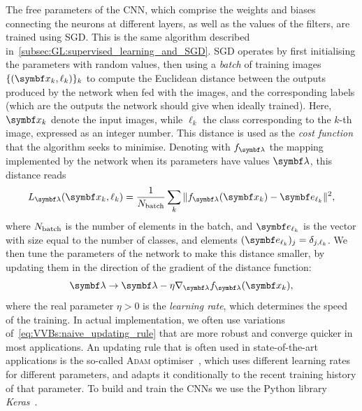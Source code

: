 The free parameters of the CNN, which comprise the weights and biases connecting the neurons at different layers, as well as the values of the filters, are trained using \ac{SGD}. This is the same algorithm described in~\cref{subsec:GL:supervised_learning_and_SGD}.
\ac{SGD} operates by first initialising the parameters with random values, then using a \emph{batch} of training images $\{(\bs x_k,\ell_k)\}_k$ to compute the Euclidean distance between the outputs produced by the network when fed with the images, and the corresponding labels (which are the outputs the network should give when ideally trained).
Here, $\bs x_k$ denote the input images, while $\ell_k$ the class corresponding to the $k$-th image, expressed as an integer number.
This distance is used as the \emph{cost function} that the algorithm seeks to minimise.
Denoting with $f_\bslambda$ the mapping implemented by the network when its parameters have values $\bslambda$, this distance reads
\begin{equation}
	L_\bslambda(\bs x_k,\ell_k) = \frac{1}{N_{\on{batch}}}
	\sum_k \|f_\bslambda(\bs x_k)-\bs e_{\ell_k}\|^2,
\end{equation}
where $N_{\operatorname{batch}}$ is the number of elements in the batch, and $\bs e_{\ell_k}$ is the vector with size equal to the number of classes, and elements $(\bs e_{\ell_k})_j=\delta_{j,\ell_k}$.
We then tune the parameters of the network to make this distance smaller, by updating them in the direction of the gradient of the distance function:
\begin{equation}
	\bslambda \to
	\bslambda - \eta \nabla_\bslambda f_\bslambda(\bs x_k),
	\label{eq:VVBs:naive_updating_rule}
\end{equation}
where the real parameter $\eta>0$ is the \emph{learning rate}, which determines the speed of the training.
In actual implementation, we often use variations of~\cref{eq:VVBs:naive_updating_rule} that are more robust and converge quicker in most applications.
An updating rule that is often used in state-of-the-art applications is the so-called \textsc{Adam} optimiser~\cite{ruder2016overview}, which uses different learning rates for different parameters, and adapts it conditionally to the recent training history of that parameter.
To build and train the \acp{CNN} we use the Python library \emph{Keras}~\cite{chollet2015keras}.


